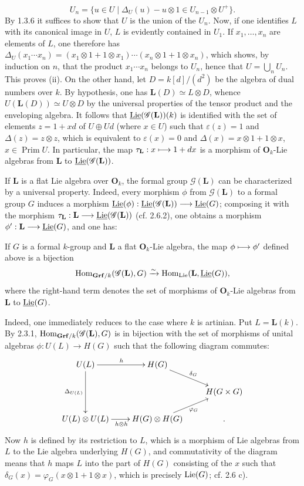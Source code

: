 \[
U_n=\{u\in U\mid\Delta_U(u)-u\otimes1\in U_{n-1}\otimes U^+\}.
\]
By 1.3.6 it suffices to show that $U$ is the union of the $U_n$. Now, if one identifies $L$ with its canonical image in $U$, $L$ is evidently contained in $U_1$. If $x_1,\ldots,x_n$ are elements of $L$, one therefore has $\Delta_U(x_1\cdots x_n)=(x_1\otimes1+1\otimes x_1)\cdots(x_n\otimes1+1\otimes x_n)$, which shows, by induction on $n$, that the product $x_1\cdots x_n$ belongs to $U_n$, hence that $U=\bigcup_n U_n$. This proves (ii).
On the other hand, let $D=k[d]/(d^2)$ be the algebra of dual numbers over $k$. By hypothesis, one has $\mathbf L(D)\simeq L\otimes D$, whence $U(\mathbf L(D))\simeq U\otimes D$ by the universal properties of the tensor product and the enveloping algebra. It follows that $\underline{\operatorname{Lie}}(\mathscr G(\mathbf L))(k)$ is identified with the set of elements $z=1+xd$ of $U\oplus Ud$ (where $x\in U$) such that $\varepsilon(z)=1$ and $\Delta(z)=z\otimes z$, which is equivalent to $\varepsilon(x)=0$ and $\Delta(x)=x\otimes1+1\otimes x$, \ie $x\in\operatorname{Prim}U$. In particular, the map $\tau_{\mathbf L}:x\longmapsto1+dx$ is a morphism of $\mathbf O_k$-Lie algebras from $\mathbf L$ to $\underline{\operatorname{Lie}}(\mathscr G(\mathbf L))$.

If $\mathbf L$ is a flat Lie algebra over $\mathbf O_k$, the formal group $\mathscr G(\mathbf L)$ can be characterized by a universal property. Indeed, every morphism $\phi$ from $\mathscr G(\mathbf L)$ to a formal group $G$ induces a morphism $\underline{\operatorname{Lie}}(\phi):\underline{\operatorname{Lie}}(\mathscr G(\mathbf L))\longrightarrow\underline{\operatorname{Lie}}(G)$; composing it with the morphism $\tau_{\mathbf L}:\mathbf L\longrightarrow\underline{\operatorname{Lie}}(\mathscr G(\mathbf L))$ (cf. 2.6.2), one obtains a morphism $\phi':\mathbf L\longrightarrow\underline{\operatorname{Lie}}(G)$, and one has:
\begin{proposition}{}
If $G$ is a formal $k$-group and $\mathbf L$ a flat $\mathbf O_k$-Lie algebra, the map $\phi\longmapsto\phi'$ defined above is a bijection
\[
\operatorname{Hom}_{\mathbf{Grf}/k}(\mathscr G(\mathbf L),G)\xrightarrow{\sim}\operatorname{Hom}_{\operatorname{Lie}}(\mathbf L,\underline{\operatorname{Lie}}(G)),
\]
where the right-hand term denotes the set of morphisms of $\mathbf O_k$-Lie algebras from $\mathbf L$ to $\underline{\operatorname{Lie}}(G)$.
\end{proposition}
Indeed, one immediately reduces to the case where $k$ is artinian. Put $L=\mathbf L(k)$. By 2.3.1, $\operatorname{Hom}_{\mathbf{Grf}/k}(\mathscr G(\mathbf L),G)$ is in bijection with the set of morphisms of unital algebras $\phi:U(L)\to H(G)$ such that the following diagram commutes:
\[
\xymatrix@C=22pt@R=17pt{
U(L)\ar[r]^h\ar[dd]_{\Delta_{U(L)}}&H(G)\ar[dr]^{\delta_G}&\\
&&H(G\times G)\\
U(L)\otimes U(L)\ar[r]_{h\otimes h}&H(G)\otimes H(G)\ar[ur]_{\varphi_G}&.}
\]
Now $h$ is defined by its restriction to $L$, which is a morphism of Lie algebras from $L$ to the Lie algebra underlying $H(G)$, and commutativity of the diagram means that $h$ maps $L$ into the part of $H(G)$ consisting of the $x$ such that $\delta_G(x)=\varphi_G(x\otimes1+1\otimes x)$, which is precisely $\operatorname{Lie}(G)$; cf. 2.6 c).

